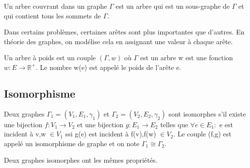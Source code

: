 \begin{defn}
Un arbre couvrant dans un graphe $\Gamma$ est un arbre qui est un sous-graphe de $\Gamma$ et qui contient tous les sommets de $\Gamma$.
\end{defn}

Dans certains problèmes, certaines arêtes sont plus importantes que d'autres. En théorie des graphes, on modélise cela en assignant une valeur à chaque arête. 

\begin{defn}
Un arbre à poids est un couple $(\Gamma,w)$ où $\Gamma$ est un arbre w est une fonction $w: E \rightarrow \mathbb{R}^{+}$. Le nombre w(e) est appelé le poids de l'arête e.
\end{defn}

\begin{exmp}
\end{exmp}




\subsection{Isomorphisme}

\begin{defn}
Deux graphes $\Gamma_{1} = (V_{1},E_{1},\gamma_{1})$ et $\Gamma_{2} = (V_{2},E_{2},\gamma_{2})$ sont isomorphes s'il existe une bijection $f: V_{1} \rightarrow V_{2}$ et une bijection $g: E_{1} \rightarrow E_{2}$ telles que $\forall e \in E_{1}:$ e est incident à v,w $\in V_{1}$ ssi g(e) est incident à f(v),f(w) $\in V_{2}$. Le couple (f,g) est appelé un isomorphisme de graphe et on note $\Gamma_{1} \cong \Gamma_{2}$.
\end{defn}

Deux graphes isomorphes ont les mêmes propriétés.

\begin{exmp}
\end{exmp}



\newpage


